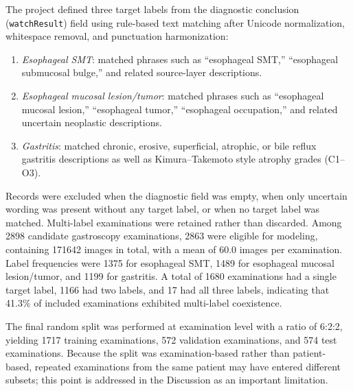 \documentclass[Afour,sagev,times]{sagej}
\begin{document}
The project defined three target labels from the diagnostic conclusion (\texttt{watchResult}) field using rule-based text matching after Unicode normalization, whitespace removal, and punctuation harmonization:
\begin{enumerate}
\item[(1)] \textit{Esophageal SMT}: matched phrases such as ``esophageal SMT,'' ``esophageal submucosal bulge,'' and related source-layer descriptions.
\item[(2)] \textit{Esophageal mucosal lesion/tumor}: matched phrases such as ``esophageal mucosal lesion,'' ``esophageal tumor,'' ``esophageal occupation,'' and related uncertain neoplastic descriptions.
\item[(3)] \textit{Gastritis}: matched chronic, erosive, superficial, atrophic, or bile reflux gastritis descriptions as well as Kimura--Takemoto style atrophy grades (C1--O3).
\end{enumerate}

Records were excluded when the diagnostic field was empty, when only uncertain wording was present without any target label, or when no target label was matched. Multi-label examinations were retained rather than discarded. Among 2898 candidate gastroscopy examinations, 2863 were eligible for modeling, containing 171642 images in total, with a mean of 60.0 images per examination. Label frequencies were 1375 for esophageal SMT, 1489 for esophageal mucosal lesion/tumor, and 1199 for gastritis. A total of 1680 examinations had a single target label, 1166 had two labels, and 17 had all three labels, indicating that 41.3\% of included examinations exhibited multi-label coexistence.

The final random split was performed at examination level with a ratio of 6:2:2, yielding 1717 training examinations, 572 validation examinations, and 574 test examinations. Because the split was examination-based rather than patient-based, repeated examinations from the same patient may have entered different subsets; this point is addressed in the Discussion as an important limitation.
\end{document}
